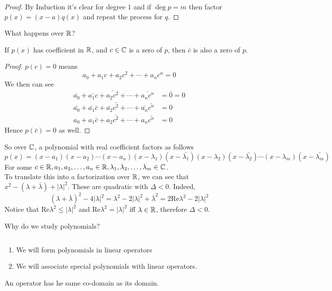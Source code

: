 \begin{proof}
    By Induction it's clear for degree $1$ and if $\deg p = m$ then factor $p(x) = (x - a)q(x)$ and repeat the process for $q$.
\end{proof}
\begin{question}
    What happens over $\mathbb R$?
\end{question}
\begin{theorem}
    If $p(x)$ has coefficient in $\mathbb R$, and $c \in \mathbb C$ is a zero of $p$, then $\bar c$ is also a zero of $p$.
\end{theorem}
\begin{proof}
    $p(c) = 0$ means \[a_0 + a_1 c + a_2 c^2 + \cdots + a_nc^n = 0\] We then can see \begin{align*}
        \bar{a_0} + \bar{a_1 c} + \bar{a_2 c^2} + \cdots + \bar{a_n c^n} &= \bar 0 = 0 \\
        \bar{a_0} + \bar{a_1} \bar{c} + \bar{a_2} \bar{c^2} + \cdots + \bar{a_n} \bar{c^n} & = 0 \\
        a_0 + a_1 \bar c + a_2 \bar{c^2} + \cdots + a_n \bar{c^n} &= 0
    \end{align*}
    Hence $p(\bar c) = 0$ as well.
\end{proof}
So over $\mathbb C$, a polynomial with real coefficient factors as follows
\[ p(x) = (x - a_1)(x - a_2)\cdots(x - a_n)(x - \lambda_1)(x - \bar{\lambda_1})(x - \lambda_2)(x - \bar{\lambda_2}) \cdots (x - \lambda_m)(x - \bar{\lambda_m})\]
For some $c \in \mathbb R, {a}_1,{a}_2, \ldots, {a}_{n} \in \mathbb R, {\lambda}_1,{\lambda}_2, \ldots, {\lambda}_{m} \in \mathbb C$. \\
To translate this into a factorization over $\mathbb R$, we can see that $x^2 - (\lambda + \bar \lambda) + |\lambda|^2$. These are quadratic with $\Delta < 0$. Indeed, 
\[ (\lambda + \bar \lambda)^2 - 4 |\lambda|^2 = \lambda ^2 - 2 |\lambda |^2 + {\bar \lambda}^2 = 2 \text{Re} \lambda^2 - 2 |\lambda|^2 \]
Notice that $\text{Re} \lambda^2 \leq |\lambda|^2$ and $\text{Re} \lambda^2 = |\lambda|^2$ iff $\lambda \in \mathbb R$, therefore $\Delta < 0$.
\begin{question}
    Why do we study polynomials?
\end{question}
\begin{answer} $ $
\begin{enumerate}
    \item We will form polynomials in linear operators
    \item We will associate special polynomials with linear operators.
\end{enumerate}
\end{answer}
\begin{remark}
An operator has he same co-domain as its domain.
\end{remark}

